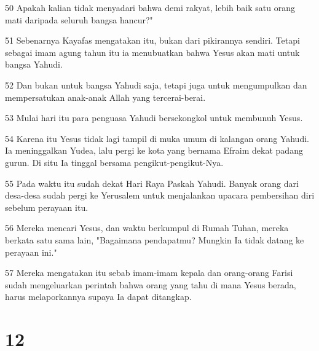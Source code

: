 \par 50 Apakah kalian tidak menyadari bahwa demi rakyat, lebih baik satu orang mati daripada seluruh bangsa hancur?"
\par 51 Sebenarnya Kayafas mengatakan itu, bukan dari pikirannya sendiri. Tetapi sebagai imam agung tahun itu ia menubuatkan bahwa Yesus akan mati untuk bangsa Yahudi.
\par 52 Dan bukan untuk bangsa Yahudi saja, tetapi juga untuk mengumpulkan dan mempersatukan anak-anak Allah yang tercerai-berai.
\par 53 Mulai hari itu para penguasa Yahudi bersekongkol untuk membunuh Yesus.
\par 54 Karena itu Yesus tidak lagi tampil di muka umum di kalangan orang Yahudi. Ia meninggalkan Yudea, lalu pergi ke kota yang bernama Efraim dekat padang gurun. Di situ Ia tinggal bersama pengikut-pengikut-Nya.
\par 55 Pada waktu itu sudah dekat Hari Raya Paskah Yahudi. Banyak orang dari desa-desa sudah pergi ke Yerusalem untuk menjalankan upacara pembersihan diri sebelum perayaan itu.
\par 56 Mereka mencari Yesus, dan waktu berkumpul di Rumah Tuhan, mereka berkata satu sama lain, "Bagaimana pendapatmu? Mungkin Ia tidak datang ke perayaan ini."
\par 57 Mereka mengatakan itu sebab imam-imam kepala dan orang-orang Farisi sudah mengeluarkan perintah bahwa orang yang tahu di mana Yesus berada, harus melaporkannya supaya Ia dapat ditangkap.

\chapter{12}

